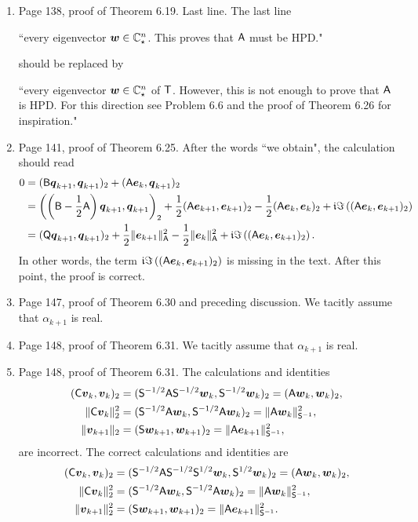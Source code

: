 \documentclass{book}
\begin{document}
\begin{enumerate}
	\item
Page 138, proof of Theorem 6.19. Last line. The last line

\hspace{0.25in}``every eigenvector $\boldsymbol{w}\in\mathbb C^n_\star$. This proves that $\mathsf{A}$ must be HPD."

\noindent should be replaced by

\hspace{0.25in}``every eigenvector $\boldsymbol{w}\in\mathbb C^n_\star$ of $\mathsf{T}$. However, this is not enough to prove that $\mathsf{A}$ is HPD. For this direction see Problem 6.6 and the proof of Theorem 6.26 for inspiration."

	\item
Page 141, proof of Theorem 6.25. After the words ``we obtain", the calculation should read
	\begin{align*}
0 &=  (\mathsf{B}\boldsymbol{q}_{k+1},\boldsymbol{q}_{k+1})_2 + (\mathsf{A}\boldsymbol{e}_k,\boldsymbol{q}_{k+1})_2 
	\\
&=  \left( \left(\mathsf{B}-\frac12\mathsf{A} \right)\boldsymbol{q}_{k+1},\boldsymbol{q}_{k+1} \right)_2 + \frac12(\mathsf{A}\boldsymbol{e}_{k+1},\boldsymbol{e}_{k+1})_2 - \frac12(\mathsf{A}\boldsymbol{e}_k,\boldsymbol{e}_k)_2 + \mathfrak{i}\Im\left((\mathsf{A}\boldsymbol{e}_k,\boldsymbol{e}_{k+1})_2 \right)
	\\
& =  (\mathsf{Q}\boldsymbol{q}_{k+1},\boldsymbol{q}_{k+1})_2 + \frac12 \| \boldsymbol{e}_{k+1} \|_{\mathsf{A}}^2 - \frac12 \| \boldsymbol{e}_k \|_{\mathsf{A}}^2 + \mathfrak{i}\Im\left((\mathsf{A}\boldsymbol{e}_k,\boldsymbol{e}_{k+1})_2 \right).
	\end{align*}
In other words, the term $\mathfrak{i}\Im\left((\mathsf{A}\boldsymbol{e}_k,\boldsymbol{e}_{k+1})_2 \right)$ is missing in the text. After this point, the proof is correct.

	\item
Page 147, proof of Theorem 6.30 and preceding discussion. We tacitly assume that $\alpha_{k+1}$ is real.

	\item
Page 148, proof of Theorem 6.31. We tacitly assume that $\alpha_{k+1}$ is real.

	\item
Page 148, proof of Theorem 6.31.  The calculations and identities 
\begin{align*}
  (\mathsf{C}\boldsymbol{v}_k,\boldsymbol{v}_k)_2 &= (\mathsf{S}^{-1/2}\mathsf{A}\mathsf{S}^{-1/2}\boldsymbol{w}_k,\mathsf{S}^{-1/2}\boldsymbol{w}_k)_2 = (\mathsf{A}\boldsymbol{w}_k,\boldsymbol{w}_k)_2, \\ 
  \| \mathsf{C}\boldsymbol{v}_k \|_2^2 &= (\mathsf{S}^{-1/2}\mathsf{A}\boldsymbol{w}_k,\mathsf{S}^{-1/2}\mathsf{A}\boldsymbol{w}_k)_2 = \| \mathsf{A}\boldsymbol{w}_k \|_{\mathsf{S}^{-1}}^2, \\
  \| \boldsymbol{v}_{k+1} \|_2 & = (\mathsf{S}\boldsymbol{w}_{k+1},\boldsymbol{w}_{k+1} )_2 = \| \mathsf{A}\boldsymbol{e}_{k+1} \|_{\mathsf{S}^{-1}}^2,
\end{align*}
are incorrect. The correct calculations and identities are
	\begin{align*}
(\mathsf{C}\boldsymbol{v}_k,\boldsymbol{v}_k)_2 &= (\mathsf{S}^{-1/2}\mathsf{A}\mathsf{S}^{-1/2}\mathsf{S}^{1/2}\boldsymbol{w}_k,\mathsf{S}^{1/2}\boldsymbol{w}_k)_2 = (\mathsf{A}\boldsymbol{w}_k,\boldsymbol{w}_k)_2, 
	\\ 
  \| \mathsf{C}\boldsymbol{v}_k \|_2^2 &= (\mathsf{S}^{-1/2}\mathsf{A}\boldsymbol{w}_k,\mathsf{S}^{-1/2}\mathsf{A}\boldsymbol{w}_k)_2 = \| \mathsf{A}\boldsymbol{w}_k \|_{\mathsf{S}^{-1}}^2, \\
  \| \boldsymbol{v}_{k+1} \|_2^2 & = (\mathsf{S}\boldsymbol{w}_{k+1},\boldsymbol{w}_{k+1} )_2 = \| \mathsf{A}\boldsymbol{e}_{k+1} \|_{\mathsf{S}^{-1}}^2.
\end{align*}



\end{enumerate}
\end{document}
